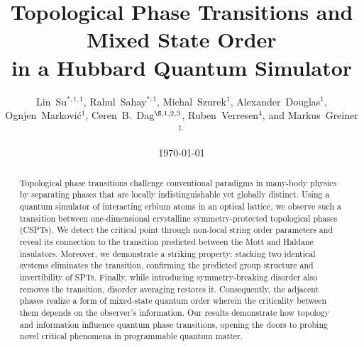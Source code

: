 \documentclass[preprint,superscriptaddress,floatfix, nofootinbib]{revtex4-2}
\begin{document}
\title{Topological Phase Transitions and Mixed State Order\\in a Hubbard Quantum Simulator}
\author{
Lin~Su$^{*,\dagger,1}$, 
Rahul~Sahay$^{*,1}$, 
Michal~Szurek$^{1}$, 
Alexander~Douglas$^{1}$, 
Ognjen~Markovi\'{c}$^{1}$, 
Ceren~B.~Dag$^{\S, 1,2,3}$, 
Ruben~Verresen$^{4}$, 
and Markus~Greiner$^{\ddagger,}$
}



\date{\today}
\begin{abstract}
Topological phase transitions challenge conventional paradigms in many-body physics by separating phases that are locally indistinguishable yet globally distinct.
%
Using a quantum simulator of interacting erbium atoms in an optical lattice, we observe such a transition between one-dimensional crystalline symmetry-protected topological phases (CSPTs).
%
We detect the critical point through non-local string order parameters and reveal its connection to the transition predicted between the Mott and Haldane insulators.
%
Moreover, we demonstrate a striking property: stacking two identical systems eliminates the transition, confirming the predicted group structure and invertibility of SPTs.
%
Finally, while introducing symmetry-breaking disorder also removes the transition, disorder averaging restores it.
%
Consequently, the adjacent phases realize a form of mixed-state quantum order wherein the criticality between them depends on the observer’s information.
%
Our results demonstrate how topology and information influence quantum phase transitions, opening the doors to probing novel critical phenomena in programmable quantum matter.
\end{abstract}

\maketitle
\end{document}
